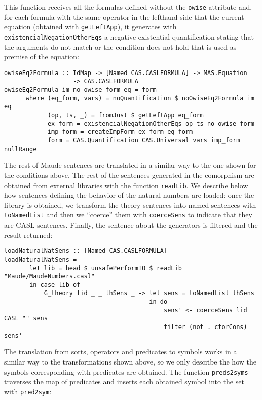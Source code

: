 This function receives all the formulas defined without the \verb"owise"
attribute and, for each formula with the same operator in the lefthand
side that the current equation (obtained with \verb"getLeftApp"), it
generates with \verb"existencialNegationOtherEqs" a negative existential
quantification stating that the arguments do not match or the condition
does not hold that is used as premise of the equation:

{\codesize
\begin{verbatim}
owiseEq2Formula :: IdMap -> [Named CAS.CASLFORMULA] -> MAS.Equation
                   -> CAS.CASLFORMULA
owiseEq2Formula im no_owise_form eq = form
      where (eq_form, vars) = noQuantification $ noOwiseEq2Formula im eq
            (op, ts, _) = fromJust $ getLeftApp eq_form
            ex_form = existencialNegationOtherEqs op ts no_owise_form
            imp_form = createImpForm ex_form eq_form
            form = CAS.Quantification CAS.Universal vars imp_form nullRange
\end{verbatim}
}

The rest of Maude sentences are translated in a similar way to the one
shown for the conditions above.
The rest of the sentences generated in the comorphism are obtained
from external libraries with the function \verb"readLib". We describe
below how sentences defining the behavior of the natural numbers are
loaded: once the library is obtained, we transform the theory sentences
into named sentences with \verb"toNamedList" and then we ``coerce''
them with \verb"coerceSens" to indicate that they are CASL sentences.
Finally, the sentence about the generators is filtered and the result
returned:

{\codesize
\begin{verbatim}
loadNaturalNatSens :: [Named CAS.CASLFORMULA]
loadNaturalNatSens = 
       let lib = head $ unsafePerformIO $ readLib "Maude/MaudeNumbers.casl"
       in case lib of
           G_theory lid _ _ thSens _ -> let sens = toNamedList thSens
                                        in do
                                            sens' <- coerceSens lid CASL "" sens
                                            filter (not . ctorCons) sens'
\end{verbatim}
}

The translation from sorts, operators and predicates to symbols
works in a similar
way to the transformations shown above, so we only describe the 
how the symbols corresponding with predicates are obtained. The function
\verb"preds2syms" traverses the map of predicates and inserts each
obtained symbol into the set with \verb"pred2sym":

